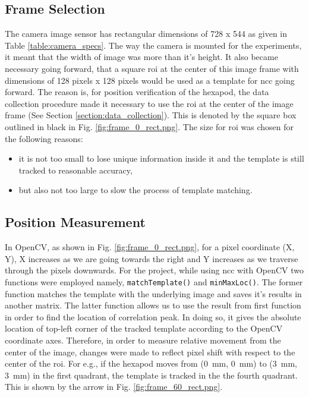     \subsection*{Frame Selection}
        The camera image sensor has rectangular dimensions of 728 x 544 as given in Table \ref{table:camera_specs}. The way the camera is mounted for the experiments, it meant that the width of image was more than it's height. It also became necessary going forward, that a square \gls{roi} at the center of this image frame with dimensions of 128 pixels x 128 pixels would be used as a template for \gls{ncc} going forward. The reason is, for position verification of the hexapod, the data collection procedure made it necessary to use the \gls{roi} at the center of the image frame (See Section \ref{section:data_collection}). This is denoted by the square box outlined in black in Fig. \ref{fig:frame_0_rect.png}. The size for \gls{roi} was chosen for the following reasons:
        \begin{itemize}
            \item it is not too small to lose unique information inside it and the template is still tracked to reasonable accuracy,
            \item but also not too large to slow the process of template matching.
        \end{itemize}
        
    \subsection*{Position Measurement}
        In OpenCV, as shown in Fig. \ref{fig:frame_0_rect.png}, for a pixel coordinate (X, Y), X increases as we are going towards the right and Y increases as we traverse through the pixels downwards. For the project, while using \gls{ncc} with OpenCV two functions were employed namely, \texttt{matchTemplate()} and \texttt{minMaxLoc()}. The former function matches the template with the underlying image and saves it's results in another matrix. The latter function allows us to use the result from first function in order to find the location of correlation peak. In doing so, it gives the absolute location of top-left corner of the tracked template according to the OpenCV coordinate axes. Therefore, in order to measure relative movement from the center of the image, changes were made to reflect pixel shift with respect to the center of the \gls{roi}. For e.g., if the hexapod moves from (\SI{0}{\milli\meter}, \SI{0}{\milli\meter}) to (\SI{3}{\milli\meter}, \SI{3}{\milli\meter}) in the first quadrant, the template is tracked in the the fourth quadrant. This is shown by the arrow in Fig. \ref{fig:frame_60_rect.png}. 

